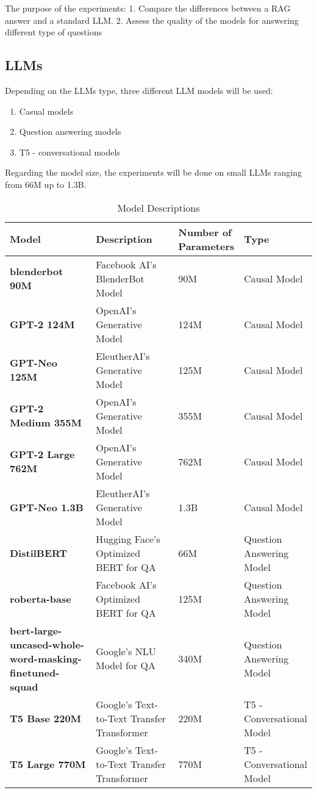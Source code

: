 \documentclass{wseas}
\begin{document}
The purpose of the experiments: 1. Compare the differences between a RAG
answer and a standard LLM. 2. Assess the quality of the models for
answering different type of questions

\subsection{LLMs}

Depending on the LLMs type, three different LLM models will be used:

\begin{enumerate}
\def\labelenumi{\arabic{enumi}.}
\item
  Casual models
\item
  Question answering models
\item
  T5 - conversational models
\end{enumerate}

Regarding the model size, the experiments will be done on small LLMs
ranging from 66M up to 1.3B.



\begin{table*}[htbp]
\centering
\caption{Model Descriptions} %
\begin{tabular}{|p{0.3451\linewidth}|p{0.3239\linewidth}|p{0.1549\linewidth}|p{0.1761\linewidth}|}
\hline
\textbf{Model} & \textbf{Description} & \textbf{Number of Parameters} & \textbf{Type} \\
\hline
\textbf{blenderbot 90M} & Facebook AI's BlenderBot Model & 90M & Causal Model \\
\hline
\textbf{GPT-2 124M} & OpenAI's Generative Model & 124M & Causal Model \\
\hline
\textbf{GPT-Neo 125M} & EleutherAI's Generative Model & 125M & Causal Model \\
\hline
\textbf{GPT-2 Medium 355M} & OpenAI's Generative Model & 355M & Causal Model \\
\hline
\textbf{GPT-2 Large 762M} & OpenAI's Generative Model & 762M & Causal Model \\
\hline
\textbf{GPT-Neo 1.3B} & EleutherAI's Generative Model & 1.3B & Causal Model \\
\hline
\textbf{DistilBERT} & Hugging Face's Optimized BERT for QA & 66M & Question Answering Model \\
\hline
\textbf{roberta-base} & Facebook AI's Optimized BERT for QA & 125M & Question Answering Model \\
\hline
\textbf{bert-large-uncased-whole-word-masking-finetuned-squad} & Google's NLU Model for QA & 340M & Question Answering Model \\
\hline
\textbf{T5 Base 220M} & Google's Text-to-Text Transfer Transformer & 220M & T5 - Conversational Model \\
\hline
\textbf{T5 Large 770M} & Google's Text-to-Text Transfer Transformer & 770M & T5 - Conversational Model \\
\hline
\end{tabular}
\end{table*}
  
\end{document}
